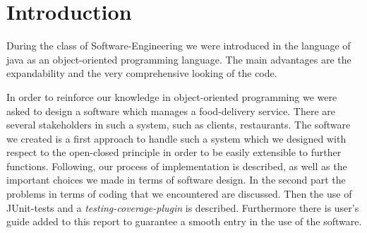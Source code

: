 \section{Introduction}
During the class of Software-Engineering we were introduced in the language of java as an object-oriented 
programming language. The main advantages are the expandability and the very comprehensive looking of 
the code.

In order to reinforce our knowledge in object-oriented programming we were asked to design a software
which manages a food-delivery service. There are several stakeholders in such a system, such as 
clients, restaurants. The software we created is a first approach to handle such a system which we
designed with respect to the open-closed principle in order to be easily extensible to further functions.
Following, our process of implementation is described, as well as the important choices we made in 
terms of software design. In the second part the problems in terms of coding that we encountered are 
discussed. Then the use of JUnit-tests and a \textit{testing-coverage-plugin} is described.
Furthermore there is user's guide added to this report to guarantee a smooth entry in the use of the
software.
